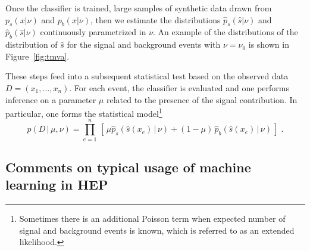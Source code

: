 \documentclass{article} %
\begin{document}
 Once the classifier is trained, large samples of synthetic data drawn from $p_s(x | \nu)$ and $p_b(x | \nu)$, then we estimate the distributions  $\hat{p}_s(\hat s | \nu)$ and $\hat{p}_b(\hat s | \nu)$ continuously parametrized in $\nu$. 
An example of the distributions of the distribution of $\hat s$ for the signal and background events with $\nu=\nu_0$ is shown in Figure~\ref{fig:tmva}.



These steps feed into a subsequent statistical test based on the observed data \\
${D=(x_1, \dots, x_n)}$. For each event, the classifier is evaluated and one performs inference on a parameter $\mu$ related to the presence of the signal contribution. In particular, one forms the statistical model\footnote{Sometimes there is an additional Poisson term when expected number of signal and background events is known, which is referred to as an extended likelihood.} 
\begin{equation}\label{eq:typicalML}
p( D \,|\, \mu, \nu) = \prod_{e=1}^n \, \left[\, \mu \hat{p}_s( \hat s(x_e) \, |\,  \nu)  + (1-\mu)\, \hat{p}_b( \hat s(x_e) \,|\, \nu) \,\right] \; .
\end{equation}

\subsection{Comments on typical usage of machine learning in HEP}
\end{document}
